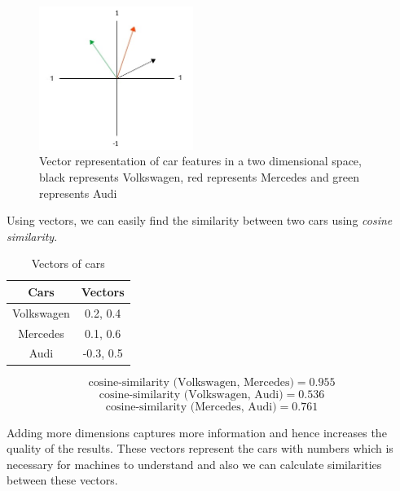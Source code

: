 \begin{figure}[!ht]
    \centering
    \includegraphics[width=5cm]{pics/wordVec_2_manycars.jpg}
    \captionsetup{justification=centering,margin=2cm}
    \caption{Vector representation of car features in a two dimensional space, black represents Volkswagen, red represents Mercedes and green represents Audi}
    \label{fig:wordVecManyCars}
\end{figure}


Using vectors, we can easily find the similarity between two cars using \textit{cosine similarity}.

\begin{table}[!ht]
\centering
\begin{tabular}{cc}
\hline
\textbf{Cars} & \textbf{Vectors} \\ \hline
Volkswagen    & 0.2, 0.4         \\ \hline
Mercedes      & 0.1, 0.6         \\ \hline
Audi          & -0.3, 0.5        \\ \hline
\end{tabular}
\caption{Vectors of cars}
\captionsetup{justification=centering,margin=2cm}
\label{my-label}
\end{table}

\begin{equation}
        \text{cosine-similarity (Volkswagen, Mercedes)} = 0.955 
\end{equation}
\begin{equation}
    \text{cosine-similarity (Volkswagen, Audi)} = 0.536
\end{equation}
\begin{equation}
    \text{cosine-similarity (Mercedes, Audi)} = 0.761
\end{equation}

Adding more dimensions captures more information and hence increases the quality of the results. These vectors represent the cars with numbers which is necessary for machines to understand and also we can calculate similarities between these vectors. 

